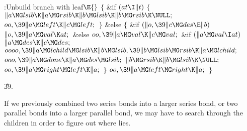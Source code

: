 \B{}:Unbuild branch with leaf\X${}\E{}$\6
${}\{{}$\1\6
\&{if} ${}(\\{at}\I\|t){}$\5
${}\{{}$\1\6
${}\|a\MG\\{lsib}\K\|a\MG\\{rsib}\K\|b\MG\\{lsib}\K\|b\MG\\{rsib}\K\NULL;{}$\6
${}\\{oo},\39\|a\MG\\{left}\K\|c\MG\\{left};{}$\6
\4${}\}{}$\5
\2\&{else}\5
${}\{{}$\1\6
\&{if} ${}(\|o,\39\|c\MG\\{des}\E\|b){}$\1\5
${}\|o,\39\|a\MG\\{val}\K\\{at};{}$\2\6
\&{else}\1\5
${}\\{oo},\39\|a\MG\\{val}\K\|c\MG\\{val};{}$\2\6
\&{if} ${}(\|a\MG\\{val}\I\\{at}){}$\1\5
${}\|a\MG\\{des}\K\|c\MG\\{des};{}$\2\6
${}\\{oooo},\39\|a\MG\\{lchild}\MG\\{lsib}\K\|b\MG\\{lsib},\39\|b\MG\\{lsib}\MG%
\\{rsib}\K\|a\MG\\{lchild};{}$\6
${}\\{ooo},\39\|a\MG\\{done}\K\|a\MG\\{des}\MG\\{lsib};{}$\6
${}\|b\MG\\{rsib}\K\|b\MG\\{lsib}\K\NULL;{}$\6
${}\\{oo},\39\|a\MG\\{right}\MG\\{left}\K\|a;{}$\6
\4${}\}{}$\2\6
${}\\{oo},\39\|a\MG\\{left}\MG\\{right}\K\|a;{}$\6
\4${}\}{}$\2\par
\U39.\fi

If we previously combined two series bonds into a larger series bond, or
two parallel bonds into a larger parallel bond, we may have to search through
the children in order to figure out where  lies.

